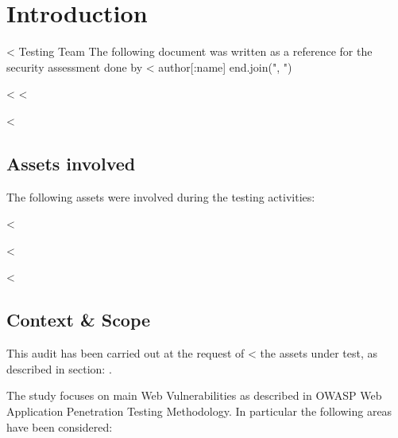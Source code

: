 

\chapter{Introduction}\label{ch:introduction}

  <%
         Testing Team %
  The following document was written as a reference for the security
  assessment done by <%
    author[:name]
  end.join(", ") %

  <%
  <%

  <%
  \section{Assets involved}\label{sec:assets}

    The following assets were involved during the testing activities:

    \begin{itemize}
      <%
        <%
          \item \textbf{<%
        <%
          \item \textbf{<%
        <%
      <%
    \end{itemize}

  <%

    <%

  <%
  \section{Context \& Scope}\label{sec:scope}

    This audit has been carried out at the request of
    <%
    the assets under test, as described in section: .

    The study focuses on main Web Vulnerabilities as described in OWASP Web
    Application Penetration Testing Methodology. In particular the following
    areas have been considered:

